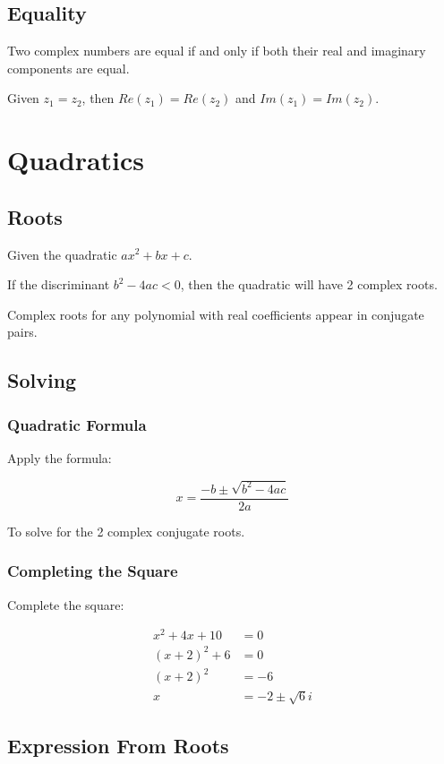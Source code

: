 \documentclass[a4paper,11pt]{report}
\begin{document}
\subsection{Equality}

Two complex numbers are equal if and only if both their real and imaginary
components are equal.

Given $z_1 = z_2$, then $Re(z_1) = Re(z_2)$ and $Im(z_1) = Im(z_2)$.


\section{Quadratics}

\subsection{Roots}

Given the quadratic $ax^2 + bx + c$.

If the discriminant $b^2 - 4ac < 0$, then the quadratic will have 2 complex
roots.

Complex roots for any polynomial with real coefficients appear in conjugate
pairs.

\subsection{Solving}

\subsubsection{Quadratic Formula}

Apply the formula:

$$
x = \frac{-b \pm \sqrt{b^2 - 4ac}}{2a}
$$

To solve for the 2 complex conjugate roots.

\subsubsection{Completing the Square}

Complete the square:

$$
\begin{aligned}
x^2 + 4x + 10 & = 0 \\
(x + 2)^2 + 6 & = 0 \\
(x + 2)^2 & = -6 \\
x & = -2 \pm \sqrt{6}i
\end{aligned}
$$

\subsection{Expression From Roots}
\end{document}
